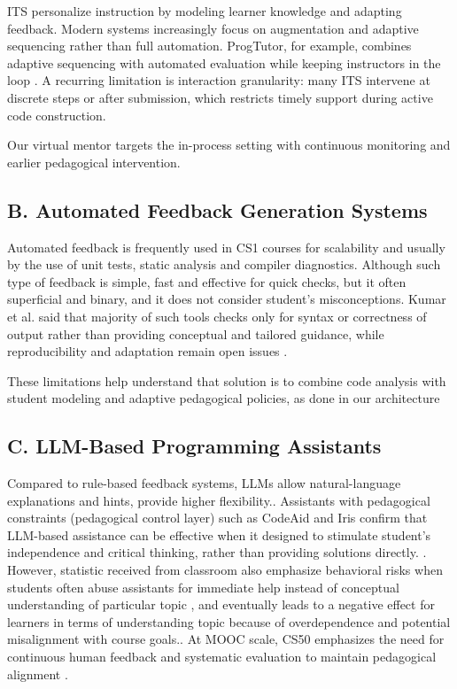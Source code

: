 \documentclass[conference]{IEEEtran}
\begin{document}
ITS personalize instruction by modeling learner knowledge and adapting feedback. Modern systems increasingly focus on augmentation and adaptive sequencing rather than full automation. ProgTutor, for example, combines adaptive sequencing with automated evaluation while keeping instructors in the loop \cite{ProgTutor}. A recurring limitation is interaction granularity: many ITS intervene at discrete steps or after submission, which restricts timely support during active code construction.

Our virtual mentor targets the in-process setting with continuous monitoring and earlier pedagogical intervention.

\subsection*{B. Automated Feedback Generation Systems}

Automated feedback is frequently used in CS1 courses for scalability and usually by the use of unit tests, static analysis and compiler diagnostics. Although such type of feedback is simple, fast and effective for quick checks, but it often superficial and binary, and it does not consider student's misconceptions. Kumar et al. said that majority of such tools checks only for syntax or correctness of output rather than providing conceptual and tailored guidance, while reproducibility and adaptation remain open issues \cite{NavigatingAutomatedFeedback}.

These limitations help understand that solution is to combine code analysis with student modeling and adaptive pedagogical policies, as done in our architecture

\subsection*{C. LLM-Based Programming Assistants}

Compared to rule-based feedback systems, LLMs allow natural-language explanations and hints, provide higher flexibility.\cite{SystematicLiteratureReviewonLLM}. Assistants with pedagogical constraints (pedagogical control layer) such as CodeAid and Iris confirm that LLM-based assistance can be effective when it designed to stimulate student's independence and critical thinking, rather than providing solutions directly. \cite{CodeAid,IRIS}. However, statistic received from classroom also emphasize behavioral risks when students often abuse assistants for immediate help instead of conceptual understanding of particular topic \cite{PatternsofLLMPoweredProgrammingAssistant}, and eventually leads to a negative effect for learners in terms of understanding topic because of overdependence and potential misalignment with course goals.\cite{FeasibilityStudyofAugmentingTeachingAssistantswithAI}. At MOOC scale, CS50 emphasizes the need for continuous human feedback and systematic evaluation to maintain pedagogical alignment \cite{ImprovingAIinCS50}.
\end{document}
